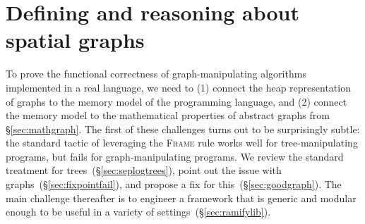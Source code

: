 \documentclass[acmsmall,screen]{acmart}
\newcommand{\tx}[1]{\text{#1}}
\newcommand{\p}[1]{\ensuremath{\mathsf{#1}}} \newcommand{\m}[1]{\ensuremath{\mathit{#1}}} \newcommand{\ma}[1]{\ensuremath{\mathcal{#1}}} \let\ramify\lightning
\newcommand{\infrulestyle}[1]{\textsc{#1}}
\begin{document}

 
\section{Defining and reasoning about spatial graphs}
\label{sec:spacegraph}


To prove the functional correctness of graph-manipulating algorithms implemented in a real language, we need to 
(1) connect the heap representation of graphs to the memory model of the 
programming language, and (2) connect the memory model to the mathematical 
properties of abstract graphs from \S\ref{sec:mathgraph}.
The first of these challenges turns out to be surprisingly subtle: 
the standard tactic of leveraging the \infrulestyle{Frame} rule 
works well for tree-manipulating programs, but fails for graph-manipulating programs.
We review the standard treatment for trees~(\S\ref{sec:seplogtrees}), 
point out the issue with graphs~(\S\ref{sec:fixpointfail}),
and propose a fix for this~(\S\ref{sec:goodgraph}).  
The main challenge thereafter is to engineer a framework that is generic 
and modular enough to be useful in a variety of 
settings~(\S\ref{sec:ramifylib}).
\end{document}
